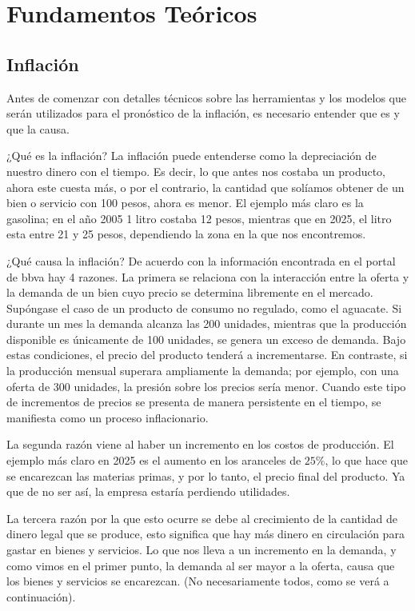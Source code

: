 \documentclass[12pt,letterpaper]{article}
\begin{document}
\section{Fundamentos Teóricos}

\subsection{Inflación}
Antes de comenzar con detalles técnicos sobre las herramientas y los modelos que serán utilizados para el pronóstico de la inflación, es necesario entender que es y que la causa. 

¿Qué es la inflación?
La inflación puede entenderse como la depreciación de nuestro dinero con el tiempo. Es decir, lo que antes nos costaba un producto, ahora este cuesta más, o por el contrario, la cantidad que solíamos obtener de un bien o servicio con 100 pesos, ahora es menor. El ejemplo más claro es la gasolina; en el año 2005 1 litro costaba 12 pesos, mientras que en 2025, el litro esta entre 21 y 25 pesos, dependiendo la zona en la que nos encontremos. 

¿Qué causa la inflación?
De acuerdo con la información encontrada en el portal de bbva \cite{bbva_inflacion} hay 4 razones. La primera se relaciona con la interacción entre la oferta y la demanda de un bien cuyo precio se determina libremente en el mercado. Supóngase el caso de un producto de consumo no regulado, como el aguacate. Si durante un mes la demanda alcanza las 200 unidades, mientras que la producción disponible es únicamente de 100 unidades, se genera un exceso de demanda. Bajo estas condiciones, el precio del producto tenderá a incrementarse. En contraste, si la producción mensual superara ampliamente la demanda; por ejemplo, con una oferta de 300 unidades, la presión sobre los precios sería menor. Cuando este tipo de incrementos de precios se presenta de manera persistente en el tiempo, se manifiesta como un proceso inflacionario.

La segunda razón viene al haber un incremento en los costos de producción. El ejemplo más claro en 2025 es el aumento en los aranceles de $25\%$, lo que hace que se encarezcan las materias primas, y por lo tanto, el precio final del producto. Ya que de no ser así, la empresa estaría perdiendo utilidades.

La tercera razón por la que esto ocurre se debe al crecimiento de la cantidad de dinero legal que se produce, esto significa que hay más dinero en circulación para gastar en bienes y servicios. Lo que nos lleva a un incremento en la demanda, y como vimos en el primer punto, la demanda al ser mayor a la oferta, causa que los bienes y servicios se encarezcan. (No necesariamente todos, como se verá a continuación). 
\end{document}
